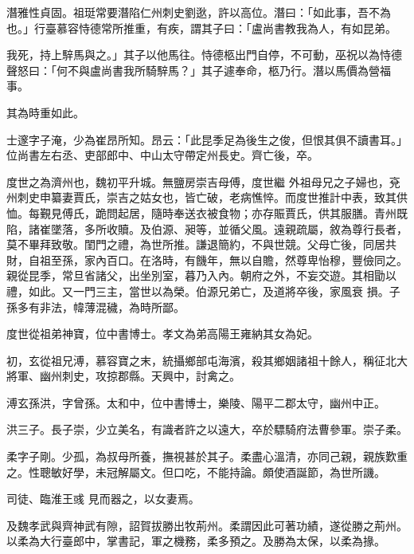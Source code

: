 \begin{pinyinscope}
 潛雅性貞固。祖珽常要潛陷仁州刺史劉逖，許以高位。潛曰：「如此事，吾不為也。」行臺慕容恃德常所推重，有疾，謂其子曰：「盧尚書教我為人，有如昆弟。



 我死，持上騂馬與之。」其子以他馬往。恃德柩出門自停，不可動，巫祝以為恃德聲怒曰：「何不與盧尚書我所騎騂馬？」其子遽奉命，柩乃行。潛以馬價為營福事。



 其為時重如此。



 士邃字子淹，少為崔昂所知。昂云：「此昆季足為後生之俊，但恨其俱不讀書耳。」位尚書左右丞、吏部郎中、中山太守帶定州長史。齊亡後，卒。



 度世之為濟州也，魏初平升城。無鹽房崇吉母傅，度世繼
 外祖母兄之子婦也，兗州刺史申纂妻賈氏，崇吉之姑女也，皆亡破，老病憔悴。而度世推計中表，致其供恤。每覲見傅氏，跪問起居，隨時奉送衣被食物；亦存賑賈氏，供其服膳。青州既陷，諸崔墜落，多所收贖。及伯源、昶等，並循父風。遠親疏屬，敘為尊行長者，莫不畢拜致敬。閨門之禮，為世所推。謙退簡約，不與世競。父母亡後，同居共財，自祖至孫，家內百口。在洛時，有饑年，無以自贍，然尊卑怡穆，豐儉同之。親從昆季，常旦省諸父，出坐別室，暮乃入內。朝府之外，不妄交遊。其相勖以禮，如此。又一門三主，當世以為榮。伯源兄弟亡，及道將卒後，家風衰
 損。子孫多有非法，幃薄混穢，為時所鄙。



 度世從祖弟神寶，位中書博士。孝文為弟高陽王雍納其女為妃。



 初，玄從祖兄溥，慕容寶之末，統攝鄉部屯海濱，殺其鄉姻諸祖十餘人，稱征北大將軍、幽州刺史，攻掠郡縣。天興中，討禽之。



 溥玄孫洪，字曾孫。太和中，位中書博士，樂陵、陽平二郡太守，幽州中正。



 洪三子。長子崇，少立美名，有識者許之以遠大，卒於驃騎府法曹參軍。崇子柔。



 柔字子剛。少孤，為叔母所養，撫視甚於其子。柔盡心溫清，亦同己親，親族歎重之。性聰敏好學，未冠解屬文。但口吃，不能持論。頗使酒誕節，為世所譏。



 司徒、臨淮王彧
 見而器之，以女妻焉。



 及魏孝武與齊神武有隙，詔賀拔勝出牧荊州。柔謂因此可著功績，遂從勝之荊州。以柔為大行臺郎中，掌書記，軍之機務，柔多預之。及勝為太保，以柔為掾。




\end{pinyinscope}
